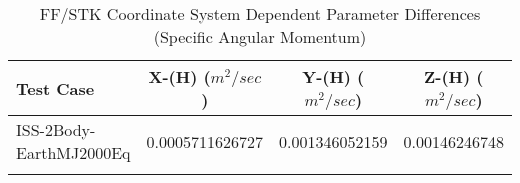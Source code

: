 \begin{table}[htbp!]
\centering
\caption{ FF/STK Coordinate System Dependent Parameter Differences (Specific Angular Momentum)}
      \begin{tabular}{lccc}
      \hline\hline
          Test Case & X-(H) ($m^2/sec$) & Y-(H) ($m^2/sec$) & Z-(H) ($m^2/sec$) \\
         \hline
         ISS-2Body-EarthMJ2000Eq & 0.0005711626727 & 0.001346052159 & 0.00146246748 \\
      \hline\hline
      \label{Table: FF-STK CS Parameters Set 3} 
\end{tabular}
\end{table}
